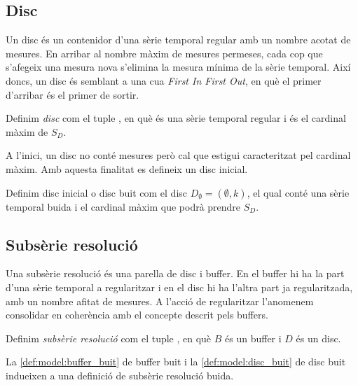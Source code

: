 \subsection{Disc}\label{sec:model:disc}


Un disc és un contenidor d'una sèrie temporal regular amb un nombre
acotat de mesures. En arribar al nombre màxim de mesures permeses,
cada cop que s'afegeix una mesura nova s'elimina la mesura mínima de
la sèrie temporal.  Així doncs, un disc és semblant a una cua
\emph{First In First Out}, en què el primer d'arribar és el
primer de sortir.

\begin{definition}[Disc]
  Definim \emph{disc} com el tuple ,
  en què  és una sèrie temporal
  regular i  és el
  cardinal màxim de $S_D$.
\end{definition}

A l'inici, un disc no conté mesures però cal que estigui caracteritzat
pel cardinal màxim. Amb aquesta finalitat es defineix un disc inicial.

\begin{definition}\label{def:model:disc_buit}
  Definim disc inicial o disc buit com el disc $D_{\emptyset} =
  (\emptyset,k)$, el qual conté una sèrie temporal buida i el cardinal
  màxim que podrà prendre $S_D$.
\end{definition}



\subsection{Subsèrie resolució}\label{sec:model:subserie-resolucio}


Una subsèrie resolució és una parella de disc i buffer. En el
buffer hi ha la part d'una sèrie temporal a regularitzar i en el disc
hi ha l'altra part ja regularitzada, amb un nombre afitat de
mesures. A l'acció de regularitzar l'anomenem consolidar en coherència
amb el concepte descrit pels buffers. 



\begin{definition}
  Definim \emph{subsèrie resolució} com el tuple
  , en què $B$ és un buffer i $D$
  és un disc.
\end{definition}
 
La \autoref{def:model:buffer_buit} de buffer buit i la
\autoref{def:model:disc_buit} de disc buit indueixen a una definició
de subsèrie resolució buida.  

